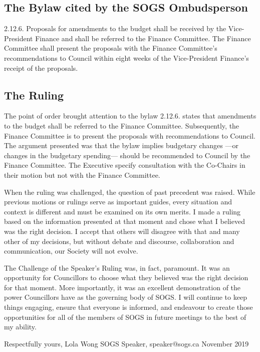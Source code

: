 \begin{multicols}{2}
\subsection*{The Bylaw cited by the SOGS Ombudsperson}
2.12.6. Proposals for amendments to the budget shall be received by the Vice-President Finance and shall be referred to the Finance Committee. The Finance Committee shall present the proposals with the Finance Committee’s recommendations to Council within eight weeks of the Vice-President Finance’s receipt of the proposals. 

\subsection*{The Ruling}
The point of order brought attention to the bylaw 2.12.6. states that amendments to the budget shall be referred to the Finance Committee. Subsequently, the Finance Committee is to present the proposals with recommendations to Council. The argument presented was that the bylaw implies budgetary changes —or changes in the budgetary spending— should be recommended to Council by the Finance Committee. The Executive specify consultation with the Co-Chairs in their motion but not with the Finance Committee.

When the ruling was challenged, the question of past precedent was raised. While previous motions or rulings serve as important guides, every situation and context is different and must be examined on its own merits. I made a ruling based on the information presented at that moment and chose what I believed was the right decision. I accept that others will disagree with that and many other of my decisions, but without debate and discourse, collaboration and communication, our Society will not evolve.

The Challenge of the Speaker’s Ruling was, in fact, paramount. It was an opportunity for Councillors to choose what they believed was the right decision for that moment. More importantly, it was an excellent demonstration of the power Councillors have as the governing body of SOGS. I will continue to keep things engaging, ensure that everyone is informed, and endeavour to create those opportunities for all of the members of SOGS in future meetings to the best of my ability.


\end{multicols}


\vskip 2cm
\noindent
Respectfully yours, \newline
\noindent
Lola Wong \newline
\indent
SOGS Speaker, \newline 
\indent
speaker@sogs.ca \newline
\indent 
November 2019